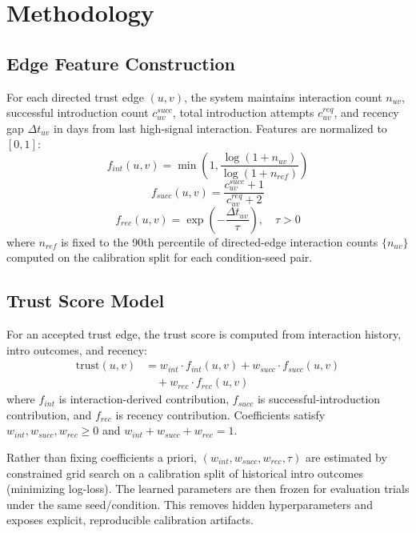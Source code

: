\documentclass[conference]{IEEEtran}
\begin{document}
\section{Methodology}
\subsection{Edge Feature Construction}
For each directed trust edge $(u,v)$, the system maintains interaction count $n_{uv}$, successful introduction count $c_{uv}^{succ}$, total introduction attempts $c_{uv}^{req}$, and recency gap $\Delta t_{uv}$ in days from last high-signal interaction. Features are normalized to $[0,1]$:
\begin{equation}
f_{int}(u,v)=\min\left(1,\frac{\log(1+n_{uv})}{\log(1+n_{ref})}\right)
\end{equation}
\begin{equation}
f_{succ}(u,v)=\frac{c_{uv}^{succ}+1}{c_{uv}^{req}+2}
\end{equation}
\begin{equation}
f_{rec}(u,v)=\exp\left(-\frac{\Delta t_{uv}}{\tau}\right),\quad \tau>0
\end{equation}
where $n_{ref}$ is fixed to the 90th percentile of directed-edge interaction counts $\{n_{uv}\}$ computed on the calibration split for each condition-seed pair.

\subsection{Trust Score Model}
For an accepted trust edge, the trust score is computed from interaction history, intro outcomes, and recency:
\begin{equation}
\begin{aligned}
\text{trust}(u,v) &= w_{int} \cdot f_{int}(u,v) + w_{succ} \cdot f_{succ}(u,v) \\
&\quad + w_{rec} \cdot f_{rec}(u,v)
\end{aligned}
\end{equation}
where $f_{int}$ is interaction-derived contribution, $f_{succ}$ is successful-introduction contribution, and $f_{rec}$ is recency contribution. Coefficients satisfy $w_{int},w_{succ},w_{rec}\ge0$ and $w_{int}+w_{succ}+w_{rec}=1$.

Rather than fixing coefficients a priori, $(w_{int},w_{succ},w_{rec},\tau)$ are estimated by constrained grid search on a calibration split of historical intro outcomes (minimizing log-loss). The learned parameters are then frozen for evaluation trials under the same seed/condition. This removes hidden hyperparameters and exposes explicit, reproducible calibration artifacts.
\end{document}
